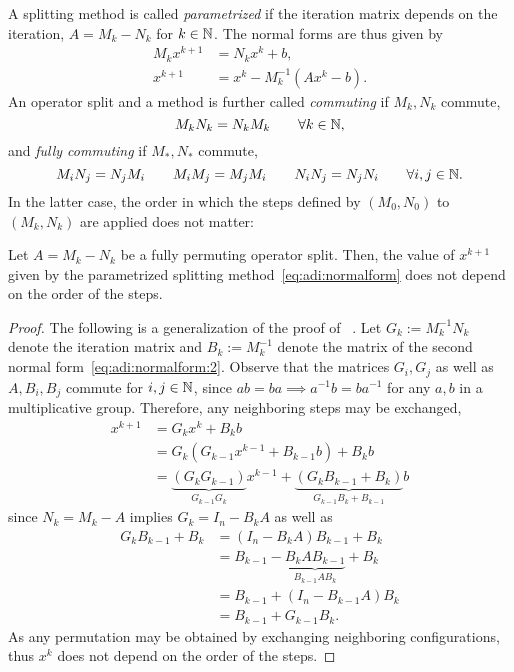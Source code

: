 A splitting method is called \emph{parametrized} if the iteration matrix depends on the iteration,
\ie $A = M_k - N_k$ for $k\in\mathbb{N}$.
The normal forms are thus given by
\begin{subequations}
\label{eq:adi:normalform}
\begin{align}
\label{eq:adi:normalform:1}
  M_k x^{k+1} &= N_k x^k + b
  ,
  \\
\label{eq:adi:normalform:2}
  x^{k+1} &= x^k - M_k^{-1} (Ax^k - b)
  .
\end{align}
\end{subequations}
An operator split and a method is further called \emph{commuting} if $M_k, N_k$ commute, \ie
\begin{equation*}
  M_k N_k = N_k M_k
  \qquad
  \forall k \in\mathbb{N},
\end{equation*}
and \emph{fully commuting} if $M_*, N_*$ commute, \ie
\begin{equation*}
  M_i N_j = N_j M_i
  \qquad
  M_i M_j = M_j M_i
  \qquad
  N_i N_j = N_j N_i
  \qquad
  \forall i,j \in\mathbb{N}
  .
\end{equation*}
In the latter case,
the order in which the steps defined by $(M_0,N_0)$ to $(M_k,N_k)$ are applied does not matter:

\begin{proposition}
\label{thm:adi:permutation}
  Let $A = M_k - N_k$ be a fully permuting operator split.
  Then, the value of $x^{k+1}$ given by the parametrized splitting method~\eqref{eq:adi:normalform}
  does not depend on the order of the steps.
\end{proposition}
\begin{proof}
  The following is a generalization of the proof of \citeauthor{Li2002}~\cite[Theorem~4.1]{Li2002}.
  Let $G_k := M_k^{-1} N_k$ denote the iteration matrix
  and $B_k := M_k^{-1}$ denote the matrix of the second normal form~\eqref{eq:adi:normalform:2}.
  Observe that the matrices $G_i, G_j$ as well as $A, B_i, B_j$ commute for $i,j\in\mathbb{N}$,
  since $ab=ba \implies a^{-1}b = ba^{-1}$ for any $a,b$ in a multiplicative group.
  Therefore, any neighboring steps may be exchanged,
  \begin{align*}
    x^{k+1}
    &= G_k x^k + B_k b \\
    &= G_k (G_{k-1} x^{k-1} + B_{k-1} b) + B_k b \\
    &= \underbrace{
      (G_k G_{k-1})
    }_{
      G_{k-1} G_k
    } x^{k-1} + \underbrace{
      (G_k B_{k-1} + B_k)
    }_{
      G_{k-1} B_k + B_{k-1}
    } b
  \end{align*}
  since $N_k = M_k - A$ implies $G_k = I_n - B_k A$ as well as
  \begin{align*}
    G_k B_{k-1} + B_k
    &= (I_n - B_k A) B_{k-1} + B_k \\
    &= B_{k-1} - \underbrace{
      B_k A B_{k-1}
    }_{
      B_{k-1} A B_k
    } + B_k \\
    &= B_{k-1} + (I_n - B_{k-1} A) B_k \\
    &= B_{k-1} + G_{k-1} B_k
    .
  \end{align*}
  As any permutation may be obtained by exchanging neighboring configurations,
  thus $x^k$ does not depend on the order of the steps.
\end{proof}

